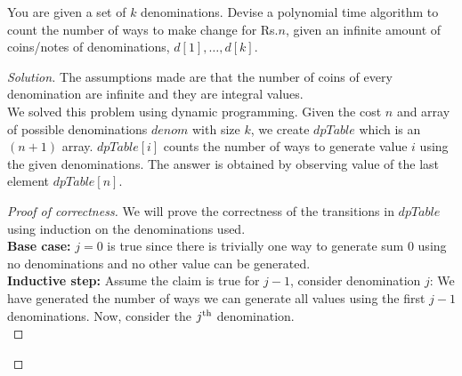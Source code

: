 \begin{solution}{4.1}
    \begin{question}
        You are given a set of $k$ denominations. Devise a polynomial time algorithm to count the number of ways to make change for Rs.$n$, given an infinite amount of coins/notes of denominations, $d[1], \ldots, d[k]$.
    \end{question}
    \tcblower{}

    \begin{proof}[Solution]
        The assumptions made are that the number of coins of every denomination are infinite and they are integral values.\\
        We solved this problem using dynamic programming. Given the cost $n$ and array of possible denominations $denom$ with size $k$, we create $dpTable$ which is an $(n+1)$ array. $dpTable[i]$ counts the number of ways to generate value $i$ using the given denominations.
        The answer is obtained by observing value of the last element $dpTable[n]$.
    \begin{algorithm}[H]
        \caption{Find total possible combinations of denominations to achieve value of $n$}\label{alg:combis}
        \begin{algorithmic}
               
             
                \EndFor{}
            \EndFor{}
        \EndProcedure{}
        \end{algorithmic}
    \end{algorithm}
        \begin{proof}[Proof of correctness]
            We will prove the correctness of the transitions in $dpTable$ using induction on the denominations used.\\
            \textbf{Base case:} $j=0$ is true since there is trivially one way to generate sum $0$ using no denominations and no other value can be generated.\\
            \textbf{Inductive step:} Assume the claim is true for $j-1$, consider denomination $j$:
            We have generated the number of ways we can generate all values using the first $j-1$ denominations. Now, consider the $j\textsuperscript{th}$ denomination.\\

\end{proof}
\end{proof}
\end{solution}
